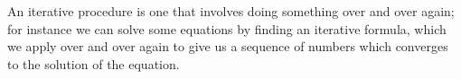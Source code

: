 An iterative procedure is one that involves doing
something over and over again; for instance we can
solve some equations by finding an iterative formula,
which we apply over and over again to give us a 
sequence of numbers which converges to the solution of
the equation.